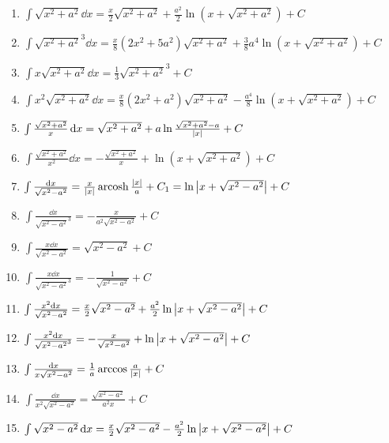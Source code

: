\begin{enumerate}
\item \(\int \sqrt{x^2+a^2} \dd{x} = \frac{x}{2} \sqrt{x^2+a^2} + \frac{a^2}{2} \ln(x+\sqrt{x^2+a^2}) + C\)

\item \(\int \sqrt{x^2+a^2}^3 \dd{x} = \frac{x}{8} (2x^2+5a^2) \sqrt{x^2+a^2} + \frac{3}{8} a^4 \ln(x+\sqrt{x^2+a^2}) + C\)

\item \(\int x\sqrt{x^2+a^2} \dd{x} = \frac{1}{3} \sqrt{x^2+a^2}^3 + C\)

\item \(\int x^2\sqrt{x^2+a^2} \dd{x} = \frac{x}{8} (2x^2+a^2) \sqrt{x^2+a^2} - \frac{a^4}{8} \ln(x+\sqrt{x^2+a^2}) + C\)

\item \(\int \frac{\sqrt{x^2+a^2}}{x} \dd{x} = \sqrt{x^2+a^2} + a\ln\frac{\sqrt{x^2+a^2}-a}{\abs{x}} + C\)

\item \(\int \frac{\sqrt{x^2+a^2}}{x^2} \dd{x} = -\frac{\sqrt{x^2+a^2}}{x} + \ln(x+\sqrt{x^2+a^2}) + C\)

\item \(\int \frac{\dd{x}}{\sqrt{x^2-a^2}} = \frac{x}{\abs{x}} \operatorname{arcosh}\frac{\abs{x}}{a} + C_1
= \ln\abs{x+\sqrt{x^2-a^2}} + C\)

\item \(\int \frac{\dd{x}}{\sqrt{x^2-a^2}^3} = -\frac{x}{a^2\sqrt{x^2-a^2}} + C\)

\item \(\int \frac{x \dd{x}}{\sqrt{x^2-a^2}} = \sqrt{x^2-a^2} + C\)

\item \(\int \frac{x \dd{x}}{\sqrt{x^2-a^2}^3} = -\frac{1}{\sqrt{x^2-a^2}} + C\)

\item \(\int \frac{x^2 \dd{x}}{\sqrt{x^2-a^2}} = \frac{x}{2} \sqrt{x^2-a^2} + \frac{a^2}{2} \ln\abs{x+\sqrt{x^2-a^2}} + C\)

\item \(\int \frac{x^2 \dd{x}}{\sqrt{x^2-a^2}^3} = -\frac{x}{\sqrt{x^2-a^2}} + \ln\abs{x+\sqrt{x^2-a^2}} + C\)

\item \(\int \frac{\dd{x}}{x\sqrt{x^2-a^2}} = \frac{1}{a} \arccos\frac{a}{\abs{x}} + C\)

\item \(\int \frac{\dd{x}}{x^2\sqrt{x^2-a^2}} = \frac{\sqrt{x^2-a^2}}{a^2 x} + C\)

\item \(\int \sqrt{x^2-a^2} \dd{x} = \frac{x}{2} \sqrt{x^2-a^2} - \frac{a^2}{2} \ln\abs{x+\sqrt{x^2-a^2}} + C\)


\end{enumerate}
